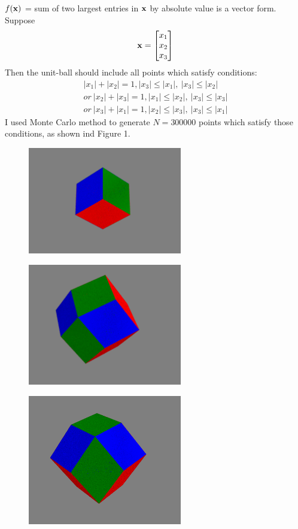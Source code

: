 \documentclass{article}
\begin{document}
$f(\boldsymbol{\mathrm{x}})$ = sum of two largest entries in $\boldsymbol{\mathrm{x}}$ by absolute value is a vector form. \\
Suppose
\begin {gather*}
\boldsymbol{\mathrm{x}}=\begin{bmatrix} x_1\\ x_2\\ x_3 \end{bmatrix}  
\end{gather*}  
Then the unit-ball should include all points which satisfy conditions:  
\begin {gather*}
|x_1|+|x_2|= 1, |x_3|\leq |x_1| , \  |x_3|\leq|x_2|\\
or \ |x_2|+|x_3|= 1, |x_1|\leq |x_2| , \  |x_3|\leq|x_3|\\
or \ |x_3|+|x_1|= 1, |x_2|\leq |x_3| , \  |x_3|\leq|x_1|
\end{gather*}  
I used Monte Carlo method to generate $N=300000 $ points which satisfy those conditions, as shown ind Figure 1. 
\begin{figure}
\includegraphics[width=0.6\textwidth]{figure1}
\centering
\end{figure} 

\begin{figure}
\includegraphics[width=0.6\textwidth]{figure2}
\centering
\end{figure} 

\begin{figure}
\includegraphics[width=0.6\textwidth]{figure3}
\centering
\end{figure} 
\end{document}
